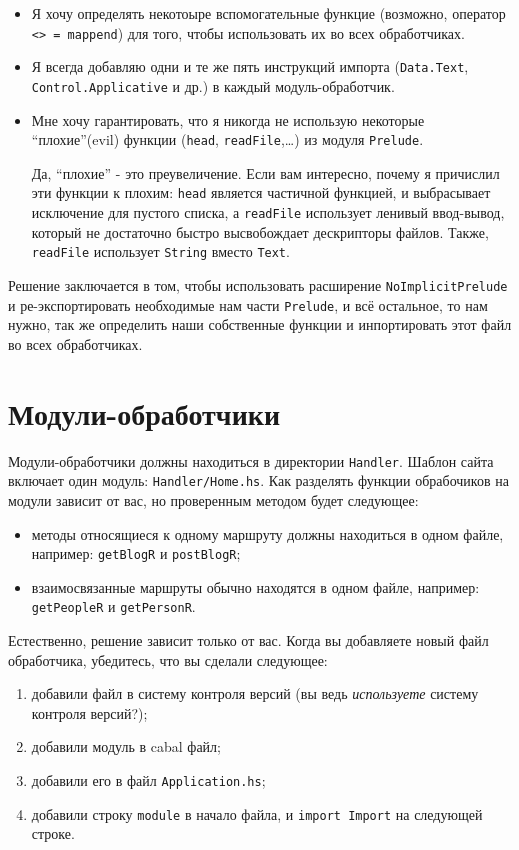 \begin{itemize}
  \item Я хочу определять некотоыре вспомогательные функцие (возможно, оператор \lstinline!<> = mappend!) 
для того, чтобы использовать их во всех обработчиках.
  \item Я всегда добавляю одни и те же пять инструкций импорта  (\lstinline!Data.Text!, \lstinline!Control.Applicative! и др.) в каждый модуль-обработчик.
  \item Мне хочу гарантировать, что я никогда не использую некоторые ``плохие''(evil) функции (\lstinline!head!,
\lstinline!readFile!,\ldots) из модуля \lstinline!Prelude!.
    \begin{remark}
      Да, ``плохие'' - это преувеличение. Если вам интересно, почему я причислил эти функции к плохим:
      \lstinline!head! является частичной функцией, и выбрасывает исключение для пустого списка,
      а \lstinline!readFile! использует ленивый ввод-вывод, который не достаточно быстро
      высвобождает дескрипторы файлов. Также, \lstinline!readFile! использует \lstinline!String! вместо
      \lstinline!Text!.
    \end{remark}
\end{itemize}

Решение заключается в том, чтобы использовать расширение \texttt{NoImplicitPrelude} и
ре-экспортировать необходимые нам части \lstinline!Prelude!, и всё остальное, то нам нужно, так же
определить наши собственные функции и инпортировать этот файл во всех обработчиках.

\section{Модули-обработчики}

Модули-обработчики должны находиться в директории \lstinline!Handler!. Шаблон сайта включает один
модуль: \lstinline!Handler/Home.hs!. Как разделять функции обрабочиков на модули зависит от вас, но
проверенным методом будет следующее:
\begin{itemize}
  \item методы относящиеся к одному маршруту должны находиться в одном файле, например: \lstinline!getBlogR!
    и \lstinline!postBlogR!;
  \item взаимосвязанные маршруты обычно находятся в одном файле, например: \lstinline!getPeopleR! и \lstinline!getPersonR!.
\end{itemize}

Естественно, решение зависит только от вас. Когда вы добавляете новый файл обработчика, убедитесь,
что вы сделали следующее:
\begin{enumerate}
  \item добавили файл в систему контроля версий (вы ведь \emph{используете} систему контроля версий?);
  \item добавили модуль в cabal файл;
  \item добавили его в файл \texttt{Application.hs};
  \item добавили строку \lstinline!module! в начало файла, и \lstinline!import Import! на следующей строке.
\end{enumerate}

